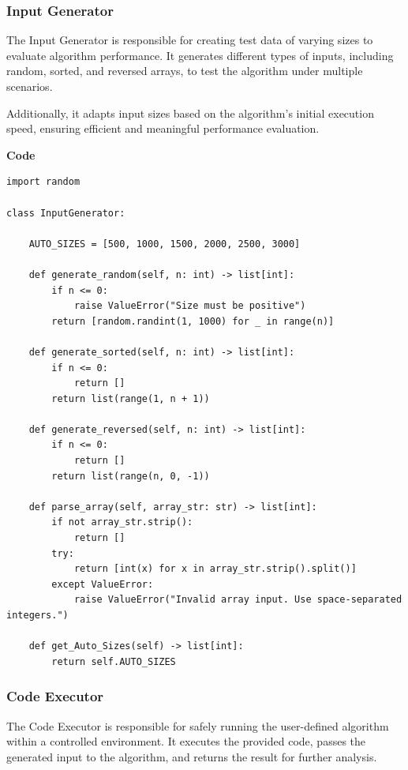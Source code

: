\documentclass[12pt]{article}
\begin{document}
\newpage
\subsubsection{Input Generator}

The Input Generator is responsible for creating test data of varying sizes to evaluate algorithm performance. It generates different types of inputs, including random, sorted, and reversed arrays, to test the algorithm under multiple scenarios.

Additionally, it adapts input sizes based on the algorithm’s initial execution speed, ensuring efficient and meaningful performance evaluation.

\vspace{1cm}
\textbf{Code}

\begin{lstlisting}
import random

class InputGenerator:

    AUTO_SIZES = [500, 1000, 1500, 2000, 2500, 3000]

    def generate_random(self, n: int) -> list[int]:
        if n <= 0:
            raise ValueError("Size must be positive")
        return [random.randint(1, 1000) for _ in range(n)]

    def generate_sorted(self, n: int) -> list[int]:
        if n <= 0:
            return []
        return list(range(1, n + 1))

    def generate_reversed(self, n: int) -> list[int]:
        if n <= 0:
            return []
        return list(range(n, 0, -1))

    def parse_array(self, array_str: str) -> list[int]:
        if not array_str.strip():
            return []
        try:
            return [int(x) for x in array_str.strip().split()]
        except ValueError:
            raise ValueError("Invalid array input. Use space-separated integers.")
        
    def get_Auto_Sizes(self) -> list[int]:
        return self.AUTO_SIZES

\end{lstlisting}

\newpage
\subsubsection{Code Executor}

The Code Executor is responsible for safely running the user-defined algorithm within a controlled environment. It executes the provided code, passes the generated input to the algorithm, and returns the result for further analysis.
\end{document}
